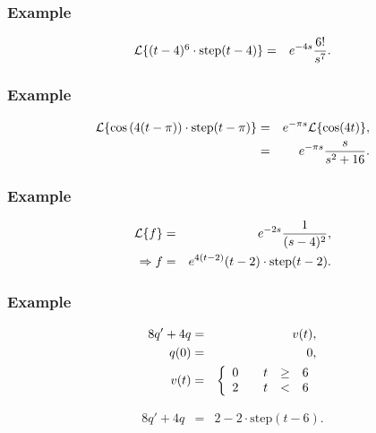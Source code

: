 \begin{frame}
  \frametitle{Example}

  \begin{eqnarray*}
    \laplace{(t-4)^6\cdot\mathrm{step}(t-4)} & = & e^{-4s}\frac{6!}{s^7}.
  \end{eqnarray*}


\end{frame}


\begin{frame}
  \frametitle{Example}

  \begin{eqnarray*}
    \laplace{\cos\lp 4(t-\pi)\rp\cdot\mathrm{step}(t-\pi)} & = & 
    e^{-\pi s}\laplace{\cos(4t)}, \\
    & = & e^{-\pi s} \frac{s}{s^2+16}.
  \end{eqnarray*}

\end{frame}



\begin{frame}
  \frametitle{Example}

  \begin{eqnarray*}
    \laplace{f} & = & e^{-2s}\frac{1}{(s-4)^2}, \\
    \Rightarrow f & = & e^{4(t-2)}(t-2) \cdot \mathrm{step}(t-2).
  \end{eqnarray*}

\end{frame}





\begin{frame}
  \frametitle{Example}

  \begin{eqnarray*}
    8q' + 4q & = & v(t), \\
    q(0) & = & 0, \\
    v(t) & = & 
    \left\{
      \begin{array}{r@{\hspace{2em}}rcl}
        0 & t & \geq & 6 \\
        2 & t & < & 6
      \end{array}
    \right.
  \end{eqnarray*}

  {
    \begin{eqnarray*}
      8q' + 4q & = & 2 - 2 \cdot \mathrm{step}(t-6).
    \end{eqnarray*}
        
  }

\end{frame}


